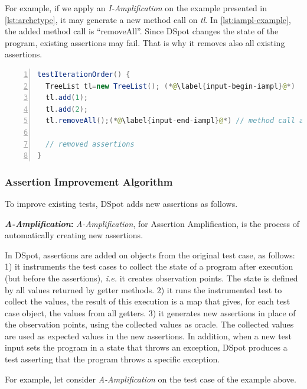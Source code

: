\documentclass[table,xcdraw,smallextended]{svjour3}
\newcommand{\Iampl}{\emph{I-Amplification}\xspace}
\newcommand{\Aampl}{\emph{A-Amplification}\xspace}
\newcommand{\ie}{\textit{i.e.}\xspace}
\newcommand{\dspot}{DSpot\xspace}
\begin{document}
For example, if we apply an \Iampl on the example presented in \autoref{lst:archetype}, it may generate a new method call on \emph{tl}.
In \autoref{lst:iampl-example}, the added method call is ``removeAll''. Since \dspot changes the state of the program, existing assertions may fail. That is why it removes also all existing assertions.


\begin{lstlisting}[caption={An example of an \Iampl{}: the amplification added a method call to \emph{removeAll()} on \emph{tl}.},label=lst:iampl-example,float,language=java,numbers=left] 
testIterationOrder() {
  TreeList tl=new TreeList(); (*@\label{input-begin-iampl}@*)
  tl.add(1);
  tl.add(2);
  tl.removeAll();(*@\label{input-end-iampl}@*) // method call added
  
  // removed assertions
}
\end{lstlisting}

\subsubsection{Assertion Improvement Algorithm}
\label{subsec:new-assertions}

To improve existing tests, \dspot adds new assertions as follows.

\textbf{\Aampl:} \Aampl, for Assertion Amplification, is the process of automatically creating new assertions.

In \dspot, assertions are added on objects from the original test case, as follows: 
1) it instruments the  test cases to collect the state of a program after execution (but before the assertions), \ie it creates observation points. The state is defined by all values returned by getter methods.
2) it runs the instrumented test to collect the values,
the result of this execution is a map that gives, for each test case object, the values from all getters.
3) it generates new assertions in place of the observation points, using the collected values as oracle. The collected values are used as expected values in the new assertions.
In addition, when a new test input sets the program in a state that throws an exception,  \dspot produces a test asserting that the program throws a specific exception.

For example, let consider \Aampl{} on the test case of the example above. 
\end{document}
